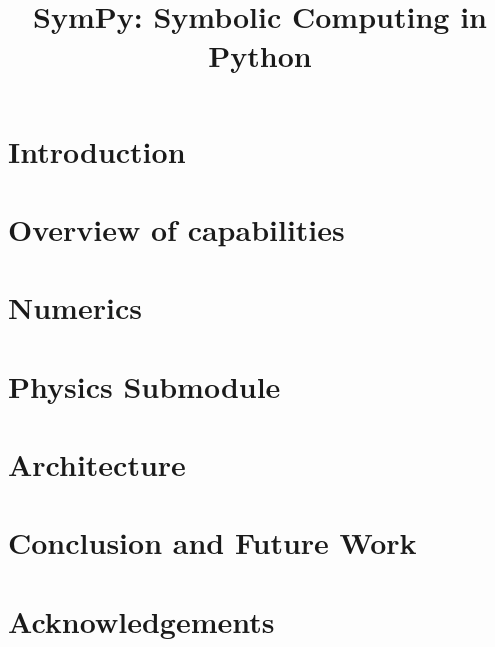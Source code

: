 \documentclass[fleqn,10pt,lineno,numbers]{wlpeerj} %
\title{SymPy: Symbolic Computing in Python}
\begin{document}
\flushbottom
\maketitle
\thispagestyle{empty}

\section{Introduction}




\section{Overview of capabilities}
\label{sec:features}




\section{Numerics}
\label{sec:numerics}




\section{Physics Submodule}
\label{sec:domain_specific}



\section{Architecture}
\label{sec:architecture}



\section{Conclusion and Future Work}
\label{sec:conclusion}



\section{Acknowledgements}
\label{sec:acknowledgements}




\end{document}
